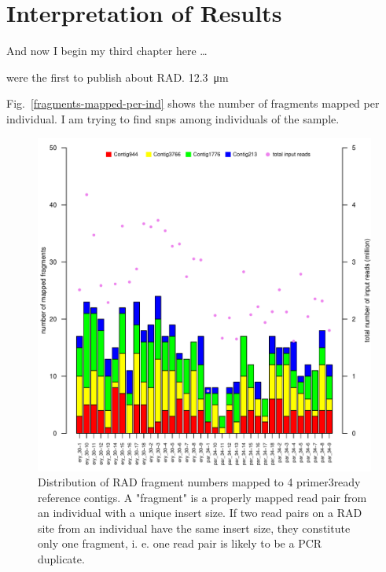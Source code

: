 \documentclass[a4paper,12pt,times,print,index, custombib]{PhDThesisPSnPDF}\usepackage[]{graphicx}\usepackage[]{color}
\newenvironment{knitrout}{}{} %
\begin{document}
\section{Interpretation of Results}



And now I begin my third chapter here \dots

\cite{Baird2008} were the first to publish about RAD. \SI{12,3}{\micro\metre}

Fig.~\vref{fragments-mapped-per-ind} shows the number of \glspl{fragment} mapped per individual.
I am trying to find \glspl{snp} among individuals of the sample.

\begin{figure}
\begin{knitrout}
\color{fgcolor}

{\centering \includegraphics[width=\linewidth]{figure/fragments_mapped_per_ind-1} 

}



\end{knitrout}
\caption{Distribution of RAD fragment numbers mapped to 4 primer3ready reference contigs. 
A "fragment" is a properly mapped read pair from an individual with a unique insert size. 
If two read pairs on a RAD site from an individual have the same insert size, they constitute only one fragment, i. e. one read pair is likely to be a PCR duplicate.}
\label{fragments-mapped-per-ind}
\end{figure}
\end{document}
